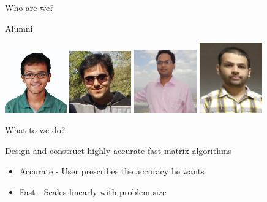 \documentclass{beamer}
\begin{document}
\begin{frame}{Who are we?}
	\begin{center}
	\huge{Alumni}
	\end{center}
	\begin{center}
	\includegraphics[width=0.2\textwidth]{./images/Shyam.jpeg} \hspace{1em}
	\includegraphics[width=0.2\textwidth]{./images/Karan.jpeg} \hspace{1em}
	\includegraphics[width=0.2025\textwidth]{./images/Nachiketa.jpg} \hspace{1em}
	\includegraphics[width=0.2025\textwidth]{./images/Abhay.png} \hspace{1em}
	\end{center}
\end{frame}

\begin{frame}{What to we do?}
	\Large
	\begin{center}
	Design and construct highly accurate fast matrix algorithms
	\begin{itemize}
		\item
		Accurate - User prescribes the accuracy he wants
		\item
		Fast - Scales linearly with problem size
	\end{itemize}
	\end{center}
\end{frame}
\end{document}
